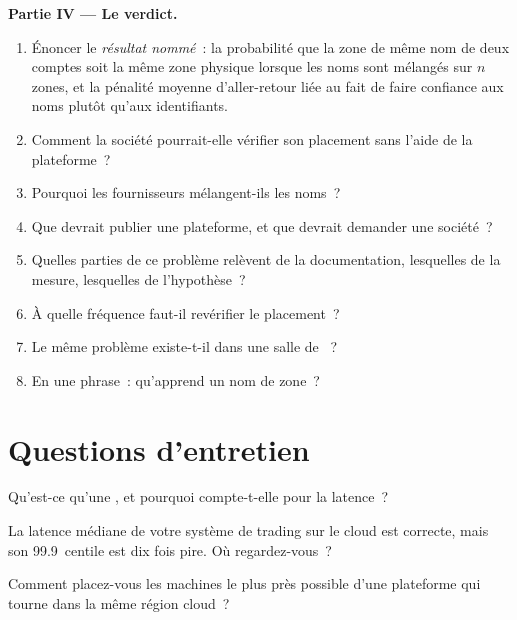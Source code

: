 \begin{problem}
\medskip\noindent\textbf{Partie IV --- Le verdict.}
\begin{enumerate}[resume]
\item Énoncer le \emph{résultat nommé}~: la probabilité que la zone de même nom de deux comptes soit la même zone physique lorsque les noms sont mélangés sur $n$
  zones, et la pénalité moyenne d'aller-retour liée au fait de faire confiance aux noms plutôt qu'aux identifiants.
\item Comment la société pourrait-elle vérifier son placement sans l'aide de la plateforme~?
\item Pourquoi les fournisseurs mélangent-ils les noms~?
\item Que devrait publier une plateforme, et que devrait demander une société~?
\item Quelles parties de ce problème relèvent de la documentation, lesquelles de la mesure, lesquelles de l'hypothèse~?
\item À quelle fréquence faut-il revérifier le placement~?
\item Le même problème existe-t-il dans une salle de ~?
\item En une phrase~: qu'apprend un nom de zone~?
\end{enumerate}
\end{problem}

\section{Questions d'entretien}

\begin{interviewq}\label{iq:nw:trading-in-a-public-cloud:1}
Qu'est-ce qu'une , et pourquoi compte-t-elle pour la latence~?
\end{interviewq}

\begin{interviewq}\label{iq:nw:trading-in-a-public-cloud:2}
La latence médiane de votre système de trading sur le cloud est correcte, mais son 99.9~centile est dix fois pire. Où regardez-vous~?
\end{interviewq}

\begin{interviewq}\label{iq:nw:trading-in-a-public-cloud:3}
Comment placez-vous les machines le plus près possible d'une plateforme qui tourne dans la même région cloud~?
\end{interviewq}

